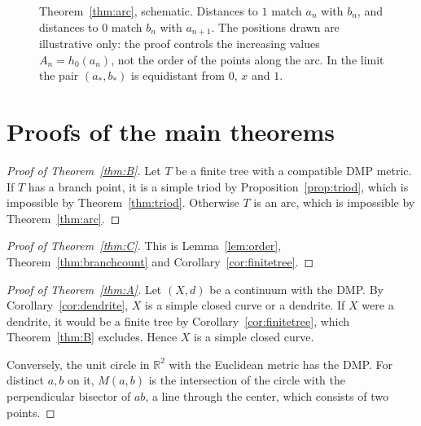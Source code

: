\documentclass[11pt]{amsart}
\theoremstyle{definition}
\theoremstyle{remark}
\newcommand{\M}{M}
\begin{document}
\begin{figure}[ht]
\centering
{}
\caption{Theorem~\ref{thm:arc}, schematic. Distances to $1$ match $a_n$ with $b_n$, and distances to $0$ match $b_n$ with $a_{n+1}$. The positions drawn are illustrative only: the proof controls the increasing values $A_n=h_0(a_n)$, not the order of the points along the arc. In the limit the pair $(a_*,b_*)$ is equidistant from $0$, $x$ and $1$.}\label{fig:arc}
\end{figure}

\section{Proofs of the main theorems}\label{sec:proofs}

\begin{proof}[Proof of Theorem~\ref{thm:B}]
Let $T$ be a finite tree with a compatible DMP metric. If $T$ has a branch point, it is a simple triod by Proposition~\ref{prop:triod}, which is impossible by Theorem~\ref{thm:triod}. Otherwise $T$ is an arc, which is impossible by Theorem~\ref{thm:arc}.
\end{proof}

\begin{proof}[Proof of Theorem~\ref{thm:C}]
This is Lemma~\ref{lem:order}, Theorem~\ref{thm:branchcount} and Corollary~\ref{cor:finitetree}.
\end{proof}

\begin{proof}[Proof of Theorem~\ref{thm:A}]
Let $(X,d)$ be a continuum with the DMP. By Corollary~\ref{cor:dendrite}, $X$ is a simple closed curve or a dendrite. If $X$ were a dendrite, it would be a finite tree by Corollary~\ref{cor:finitetree}, which Theorem~\ref{thm:B} excludes. Hence $X$ is a simple closed curve.

Conversely, the unit circle in $\mathbb R^2$ with the Euclidean metric has the DMP. For distinct $a,b$ on it, $\M(a,b)$ is the intersection of the circle with the perpendicular bisector of $ab$, a line through the center, which consists of two points.
\end{proof}
\end{document}
